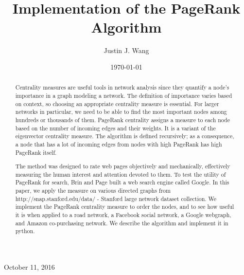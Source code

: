 \documentclass[10pt]{siamltex}
\begin{document}
\title{Implementation of the PageRank Algorithm}
\author{Justin J. Wang\footnotemark[1]  }
\date{ \today}
\maketitle

\begin{center}
     October 11, 2016
\end{center}

\vspace{5mm}

\begin{abstract}

Centrality measures are useful tools in network analysis since they quantify a node's importance in a graph modeling a network.  The definition of importance varies based on context, so choosing an appropriate centrality measure is essential. For larger networks in particular, we need to be able to find the most important nodes among hundreds or thousands of them.  PageRank centrality assigns a measure to each node based on the number of incoming edges and their weights.  It is a variant of the eigenvector centrality measure.  The algorithm is defined recursively; as a consequence, a node that has a lot of incoming edges from nodes with high PageRank has high PageRank itself.

The method was designed to rate web pages objectively and mechanically, effectively measuring the human interest and attention devoted to them.  To test the utility of PageRank for search, Brin and Page \cite{ilprints422} built a web search engine called Google.  In this paper, we apply the measure on various directed graphs from http://snap.stanford.edu/data/ - Stanford large network dataset collection.  We implement the PageRank centrality measure to order the nodes, and to see how useful it is when applied to a road network, a Facebook social network, a Google webgraph, and Amazon co-purchasing network. \cite{snapnets}  We describe the algorithm and implement it in python.

\end{abstract}
\end{document}
